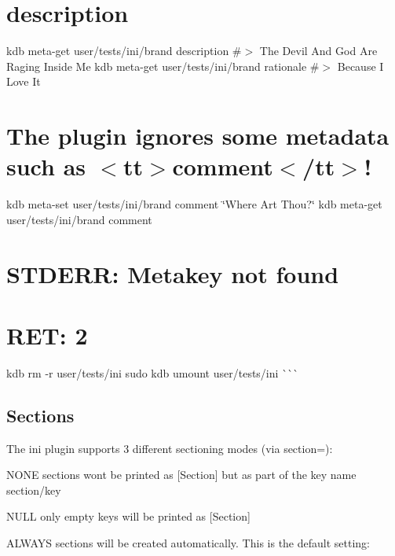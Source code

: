 \hypertarget{autotoc_md292_autotoc_md312}{}\section{description}\label{autotoc_md292_autotoc_md312}
kdb meta-\/get user/tests/ini/brand description \#$>$ The Devil And God Are Raging Inside Me kdb meta-\/get user/tests/ini/brand rationale \#$>$ Because I Love It\hypertarget{autotoc_md292_autotoc_md313}{}\section{The plugin ignores some metadata such as $<$tt$>$comment$<$/tt$>$!}\label{autotoc_md292_autotoc_md313}
kdb meta-\/set user/tests/ini/brand comment \char`\"{}\+Where Art Thou?\char`\"{} kdb meta-\/get user/tests/ini/brand comment \hypertarget{autotoc_md292_autotoc_md314}{}\section{S\+T\+D\+E\+R\+R\+: Metakey not found}\label{autotoc_md292_autotoc_md314}
\hypertarget{autotoc_md292_autotoc_md315}{}\section{R\+E\+T\+: 2}\label{autotoc_md292_autotoc_md315}
kdb rm -\/r user/tests/ini sudo kdb umount user/tests/ini \`{}\`{}\`{}\hypertarget{autotoc_md292_autotoc_md316}{}\subsection{Sections}\label{autotoc_md292_autotoc_md316}
The ini plugin supports 3 different sectioning modes (via {\ttfamily section=})\+:


\begin{DoxyItemize}
\item {\ttfamily N\+O\+NE} sections wont be printed as {\ttfamily \mbox{[}Section\mbox{]}} but as part of the key name {\ttfamily section/key}
\item {\ttfamily N\+U\+LL} only empty keys will be printed as {\ttfamily \mbox{[}Section\mbox{]}}
\item {\ttfamily A\+L\+W\+A\+YS} sections will be created automatically. This is the default setting\+:
\end{DoxyItemize}


\begin{DoxyCode}{0}
\DoxyCodeLine{\#> [a]}
\DoxyCodeLine{}
\end{DoxyCode}


